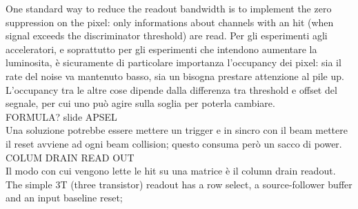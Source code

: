 One standard way to reduce the readout bandwidth is to implement the zero suppression
on the pixel: only informations about channels with an hit (when signal exceeds
the discriminator threshold) are read.
Per gli esperimenti agli acceleratori, e soprattutto per gli esperimenti che
intendono aumentare la luminosita, è sicuramente di particolare importanza
l'occupancy dei pixel: sia il rate del noise va mantenuto basso, sia un
bisogna prestare attenzione al pile up.
L'occupancy tra le altre cose dipende dalla differenza tra threshold e offset del
segnale, per cui uno può agire sulla soglia per poterla cambiare.\\
FORMULA? slide APSEL\\
Una soluzione potrebbe essere mettere un trigger e in sincro con il beam mettere
il reset avviene ad ogni beam collision; questo consuma però un sacco di power. \\

COLUM DRAIN READ OUT\\
Il modo con cui vengono lette le hit su una matrice è il column drain readout.\\
The simple 3T (three transistor) readout has a row select, a
source-follower buffer and an input baseline reset;